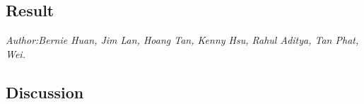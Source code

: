 
\subsection{Result}
\textit{\footnotesize Author:Bernie Huan, Jim Lan, Hoang Tan, Kenny Hsu, Rahul Aditya, Tan Phat, Wei.}\\




\subsection{Discussion}

